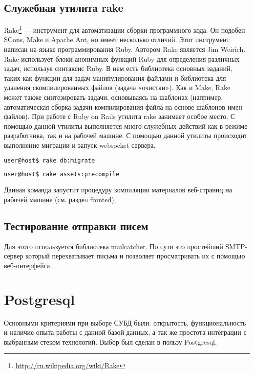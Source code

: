 \subsection{Служебная утилита rake}
Rake\footnote{
	\url{http://ru.wikipedia.org/wiki/Rake}
} — инструмент для автоматизации сборки программного кода. Он подобен
SCons, Make и Apache Ant, но имеет несколько отличий. Этот инструмент написан на языке
программирования Ruby. Автором Rake является Jim Weirich.
Rake использует блоки анонимных функций Ruby для определения различных задач,
используя синтаксис Ruby. В нем есть библиотека основных заданий, таких как
функции для задач манипулирования файлами и библиотека для удаления
скомпилированных файлов (задача «очистки»). Как и Make, Rake может также
синтезировать задачи, основываясь на шаблонах (например, автоматическая сборка
задачи компилирования файла на основе шаблонов имен файлов).
При работе с Ruby on Rails утилита rake занимает особое место. С помощью данной
утилиты выполняется много служебных действий как в режиме разработчика, так и на
рабочей машине. С помощью данной утилиты происходит выполнение миграции и запуск
websocket сервера.

\begin{lstlisting}[language=Bash,caption=Выполнение миграций
,label={lst:rails_new_application}] 
user@host$ rake db:migrate
\end{lstlisting}

\begin{lstlisting}[language=Bash,caption=Компиляция ресурсов
,label={lst:rails_new_application}] 
user@host$ rake assets:precompile
\end{lstlisting}
 
 Данная команда запустит процедуру компиляции материалов веб-страниц на рабочей
 машине (см. раздел fronted).
 
 \subsection{Тестирование отправки писем}
 Для этого используется библиотека mailcatcher. По сути это простейший
 SMTP-сервер который перехватывает письма и позволяет просматривать их с помощью
 веб-интерфейса.
 
 \section{Postgresql}
Основными критериями при выборе СУБД были: открытость, функциональность и
наличие опыта работы с данной базой данных, а так же простота интеграции с
выбранным стеком технологий. Выбор был сделан в пользу Postgresql.

